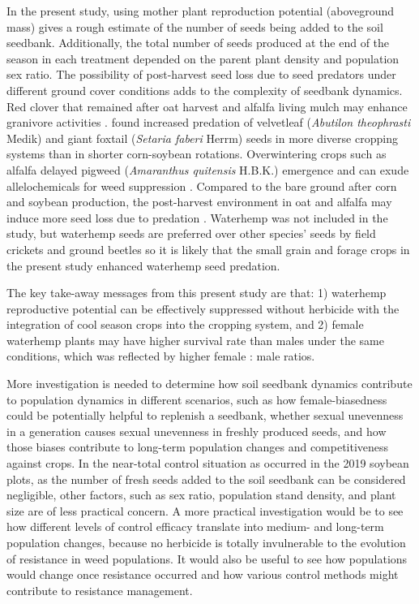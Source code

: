 \documentclass[
]{article}
\begin{document}
In the present study, using mother plant reproduction potential (aboveground mass) gives a rough estimate of the number of seeds being added to the soil seedbank. Additionally, the total number of seeds produced at the end of the season in each treatment depended on the parent plant density and population sex ratio. The possibility of post-harvest seed loss due to seed predators under different ground cover conditions adds to the complexity of seedbank dynamics. Red clover that remained after oat harvest and alfalfa living mulch may enhance granivore activities \citep{davisCroppingSystemEffects2003, gallandtEffectCovercroppingSystems2005}. \citet{heggenstallerSeasonalPatternsPostdispersal2006} found increased predation of velvetleaf (\emph{Abutilon theophrasti} Medik) and giant foxtail (\emph{Setaria faberi} Herrm) seeds in more diverse cropping systems than in shorter corn-soybean rotations. Overwintering crops such as alfalfa delayed pigweed (\emph{Amaranthus quitensis} H.B.K.) emergence \citep{huarteUnderstandingMechanismsReduced2003} and can exude allelochemicals for weed suppression \citep{millerAllelopathyForageCrop1996}. Compared to the bare ground after corn and soybean production, the post-harvest environment in oat and alfalfa may induce more seed loss due to predation \citep{gallandtEffectCovercroppingSystems2005}. Waterhemp was not included in the \citet{heggenstallerSeasonalPatternsPostdispersal2006} study, but waterhemp seeds are preferred over other species' seeds by field crickets and ground beetles \citep{vanderlaatPostdispersalWeedSeed2015} so it is likely that the small grain and forage crops in the present study enhanced waterhemp seed predation.  

The key take-away messages from this present study are that: 1) waterhemp reproductive potential can be effectively suppressed without herbicide with the integration of cool season crops into the cropping system, and 2) female waterhemp plants may have higher survival rate than males under the same conditions, which was reflected by higher female : male ratios.  

More investigation is needed to determine how soil seedbank dynamics contribute to population dynamics in different scenarios, such as how female-biasedness could be potentially helpful to replenish a seedbank, whether sexual unevenness in a generation causes sexual unevenness in freshly produced seeds, and how those biases contribute to long-term population changes and competitiveness against crops. In the near-total control situation as occurred in the 2019 soybean plots, as the number of fresh seeds added to the soil seedbank can be considered negligible, other factors, such as sex ratio, population stand density, and plant size are of less practical concern. A more practical investigation would be to see how different levels of control efficacy translate into medium- and long-term population changes, because no herbicide is totally invulnerable to the evolution of resistance in weed populations. It would also be useful to see how populations would change once resistance occurred and how various control methods might contribute to resistance management.
\end{document}
